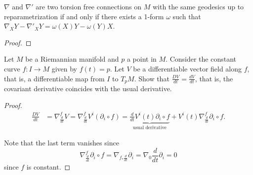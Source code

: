 \begin{exercise}
\label{exercise-two-torsion-free-connections}
$\nabla$ and $\nabla'$ are two torsion
free connections on $M$ with the same
geodesics up to reparametrization
if and only if there exists a 1-form
$\omega$ such that
$\nabla_XY-\nabla'_XY
=\omega(X)Y-\omega(Y)X$.
\end{exercise}

\begin{proof}

\end{proof}

\begin{exercise}
\label{exercise-constant-curve-connection}
Let $M$ be a Riemannian manifold and $p$ a
point in $M$. Consider the constant curve
$f:I \to M$ given by $f(t)=p$. Let $V$ be a
differentiable vector field along $f$, that
is, a differentiable map from $I$ to $T_pM$.
Show that $\frac{DV}{dt}=\frac{dV}{dt}$, that
is, the covariant derivative coincides with
the usual derivative.
\end{exercise}

\begin{proof}
$$
\begin{aligned}
\frac{DV}{dt}&=\nabla^f_{\frac{d}{dt}}V
=\nabla^f_{\frac{d}{dt}}V^i(\partial_i\circ
f)
=\underbrace{\frac{d}{dt}V^i(t)
\partial_i\circ
f}_{\text{usual derivative}}
+V^i(t)\nabla_{\frac{d}{dt}}^f\partial_i
\circ f.
\end{aligned}
$$

\noindent
Note that the last term vanishes since
$$
\nabla^f_{\frac{d}{dt}}\partial_i \circ f
= \nabla_{f_*\frac{d}{dt}}\partial_i
=\nabla_0\frac{d}{dt}\partial_i=0
$$
since $f$ is constant.
\end{proof}

